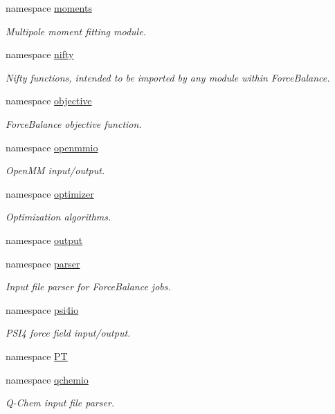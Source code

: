 \begin{DoxyCompactItemize}
namespace \hyperlink{namespaceforcebalance_1_1moments}{moments}
\begin{DoxyCompactList}\small\item\em Multipole moment fitting module. \end{DoxyCompactList}\item 
namespace \hyperlink{namespaceforcebalance_1_1nifty}{nifty}
\begin{DoxyCompactList}\small\item\em Nifty functions, intended to be imported by any module within Force\-Balance. \end{DoxyCompactList}\item 
namespace \hyperlink{namespaceforcebalance_1_1objective}{objective}
\begin{DoxyCompactList}\small\item\em Force\-Balance objective function. \end{DoxyCompactList}\item 
namespace \hyperlink{namespaceforcebalance_1_1openmmio}{openmmio}
\begin{DoxyCompactList}\small\item\em Open\-M\-M input/output. \end{DoxyCompactList}\item 
namespace \hyperlink{namespaceforcebalance_1_1optimizer}{optimizer}
\begin{DoxyCompactList}\small\item\em Optimization algorithms. \end{DoxyCompactList}\item 
namespace \hyperlink{namespaceforcebalance_1_1output}{output}
\item 
namespace \hyperlink{namespaceforcebalance_1_1parser}{parser}
\begin{DoxyCompactList}\small\item\em Input file parser for Force\-Balance jobs. \end{DoxyCompactList}\item 
namespace \hyperlink{namespaceforcebalance_1_1psi4io}{psi4io}
\begin{DoxyCompactList}\small\item\em P\-S\-I4 force field input/output. \end{DoxyCompactList}\item 
namespace \hyperlink{namespaceforcebalance_1_1PT}{P\-T}
\item 
namespace \hyperlink{namespaceforcebalance_1_1qchemio}{qchemio}
\begin{DoxyCompactList}\small\item\em Q-\/\-Chem input file parser. \end{DoxyCompactList}\item 

\end{DoxyCompactItemize}

